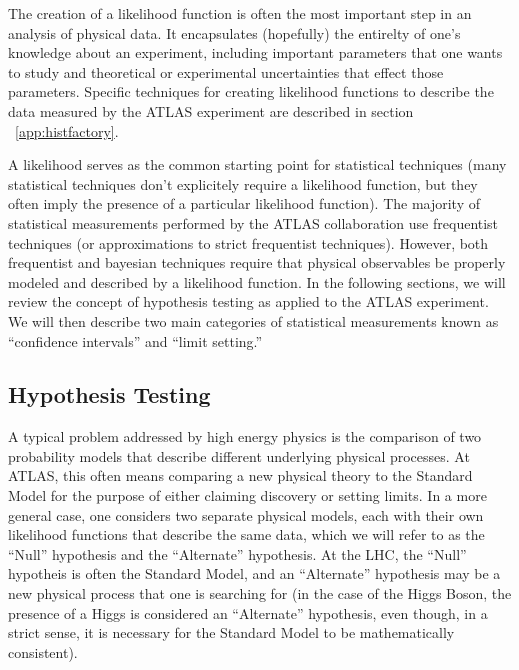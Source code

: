 
The creation of a likelihood function is often the most important step in an analysis of physical data.
It encapsulates (hopefully) the entirelty of one's knowledge about an experiment, including important parameters that one wants to study and theoretical or experimental uncertainties that effect those parameters.
Specific techniques for creating likelihood functions to describe the data measured by the ATLAS experiment are described in section ~\ref{app:histfactory}.

A likelihood serves as the common starting point for statistical techniques (many statistical techniques don't explicitely require a likelihood function, but they often imply the presence of a particular likelihood function).
The majority of statistical measurements performed by the ATLAS collaboration use frequentist techniques (or approximations to strict frequentist techniques).
However, both frequentist and bayesian techniques require that physical observables be properly modeled and described by a likelihood function.
In the following sections, we will review the concept of hypothesis testing as applied to the ATLAS experiment.
We will then describe two main categories of statistical measurements known as ``confidence intervals'' and ``limit setting.''


\subsection{Hypothesis Testing}
A typical problem addressed by high energy physics is the comparison of two probability models that describe different underlying physical processes.
At ATLAS, this often means comparing a new physical theory to the Standard Model for the purpose of either claiming discovery or setting limits.
In a more general case, one considers two separate physical models, each with their own likelihood functions that describe the same data, which we will refer to as the ``Null'' hypothesis and the ``Alternate'' hypothesis.
At the LHC, the ``Null'' hypotheis is often the Standard Model, and an ``Alternate'' hypothesis may be a new physical process that one is searching for (in the case of the Higgs Boson, the presence of a Higgs is considered an ``Alternate'' hypothesis, even though, in a strict sense, it is necessary for the Standard Model to be mathematically consistent).

